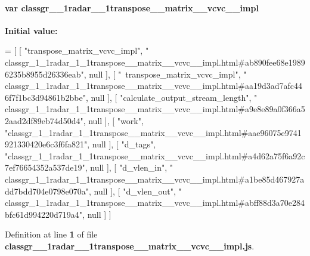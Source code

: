 \paragraph[{classgr\+\_\+1\+\_\+1radar\+\_\+1\+\_\+1transpose\+\_\+\+\_\+matrix\+\_\+\+\_\+vcvc\+\_\+\+\_\+impl}]{\setlength{\rightskip}{0pt plus 5cm}var classgr\+\_\+\_\+1radar\+\_\+\_\+1transpose\+\_\+\+\_\+matrix\+\_\+\+\_\+vcvc\+\_\+\+\_\+impl}\label{classgr__1__1radar__1__1transpose____matrix____vcvc____impl_8js_af76c73cb7b5ee4872ba171653f1b4b3d}
{\bfseries Initial value\+:}
\begin{DoxyCode}
=
[
    [ \textcolor{stringliteral}{"transpose\_matrix\_vcvc\_impl"}, \textcolor{stringliteral}{"
      classgr\_1\_1radar\_1\_1transpose\_\_matrix\_\_vcvc\_\_impl.html#ab890fee68e19896235b8955d26336eab"}, null ],
    [ \textcolor{stringliteral}{"~transpose\_matrix\_vcvc\_impl"}, \textcolor{stringliteral}{"
      classgr\_1\_1radar\_1\_1transpose\_\_matrix\_\_vcvc\_\_impl.html#aa19d3ad7afc446f7f1bc3d94861b2bbe"}, null ],
    [ \textcolor{stringliteral}{"calculate\_output\_stream\_length"}, \textcolor{stringliteral}{"
      classgr\_1\_1radar\_1\_1transpose\_\_matrix\_\_vcvc\_\_impl.html#a9e8e89a0f366a52aad2df89eb74d50d4"}, null ],
    [ \textcolor{stringliteral}{"work"}, \textcolor{stringliteral}{"classgr\_1\_1radar\_1\_1transpose\_\_matrix\_\_vcvc\_\_impl.html#aae96075e9741921330420e6c3f6fa821"}, 
      null ],
    [ \textcolor{stringliteral}{"d\_tags"}, \textcolor{stringliteral}{"classgr\_1\_1radar\_1\_1transpose\_\_matrix\_\_vcvc\_\_impl.html#a4d62a75f6a92c7ef76654352a537de19"},
       null ],
    [ \textcolor{stringliteral}{"d\_vlen\_in"}, \textcolor{stringliteral}{"
      classgr\_1\_1radar\_1\_1transpose\_\_matrix\_\_vcvc\_\_impl.html#a1be85d467927add7bdd704e0798e070a"}, null ],
    [ \textcolor{stringliteral}{"d\_vlen\_out"}, \textcolor{stringliteral}{"
      classgr\_1\_1radar\_1\_1transpose\_\_matrix\_\_vcvc\_\_impl.html#abff88d3a70e284bfc61d994220d719a4"}, null ]
]
\end{DoxyCode}


Definition at line {\bf 1} of file {\bf classgr\+\_\+\_\+1radar\+\_\+\_\+1transpose\+\_\+\+\_\+matrix\+\_\+\+\_\+vcvc\+\_\+\+\_\+impl.\+js}.

